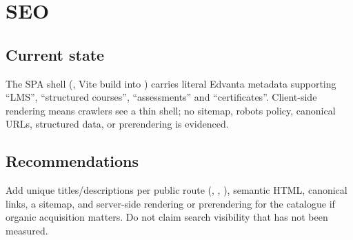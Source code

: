 \section{SEO}
\label{sec:seo}

\subsection{Current state}

The SPA shell (, Vite build into ) carries literal Edvanta metadata supporting ``LMS'', ``structured courses'', ``assessments'' and ``certificates''. Client-side rendering means crawlers see a thin shell; no sitemap, robots policy, canonical URLs, structured data, or prerendering is evidenced.

\subsection{Recommendations}

Add unique titles/descriptions per public route (\code{/}, , ), semantic HTML, canonical links, a sitemap, and server-side rendering or prerendering for the catalogue if organic acquisition matters. Do not claim search visibility that has not been measured.

